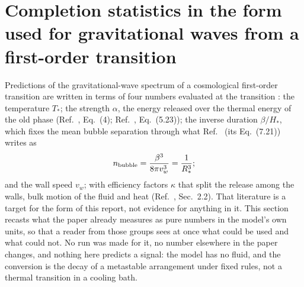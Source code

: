 \documentclass[aps,pre,10pt,twocolumn,superscriptaddress,nofootinbib]{revtex4-2}
\begin{document}
\section{Completion statistics in the form used for gravitational waves from a first-order transition}
\label{sec:gw}

Predictions of the gravitational-wave spectrum of a cosmological first-order transition are written in terms of
four numbers evaluated at the transition \cite{CapriniEtAl16,CapriniEtAl20,HLLP21,Athron23}: the temperature $T_*$;
the strength $\alpha$, the energy released over the thermal energy of the old phase (Ref.~\cite{CapriniEtAl16},
Eq.~(4); Ref.~\cite{Athron23}, Eq.~(5.23)); the inverse duration $\beta/H_*$, which fixes the mean bubble separation
through what Ref.~\cite{HLLP21} (its Eq.~(7.21)) writes as
\begin{equation}
  n_{\rm bubble} = \frac{\beta^3}{8\pi v_w^3} = \frac{1}{R_*^3};
  \label{eq:nbubble}
\end{equation}
and the wall speed $v_w$; with efficiency factors $\kappa$ that split the release among the walls, bulk motion of
the fluid and heat (Ref.~\cite{CapriniEtAl16}, Sec.~2.2). That literature is a target for the form of this report,
not evidence for anything in it. This section recasts what the paper already measures as pure numbers in the model's
own units, so that a reader from those groups sees at once what could be used and what could not. No run was made
for it, no number elsewhere in the paper changes, and nothing here predicts a signal: the model has no fluid, and
the conversion is the decay of a metastable arrangement under fixed rules, not a thermal transition in a cooling
bath.
\end{document}
